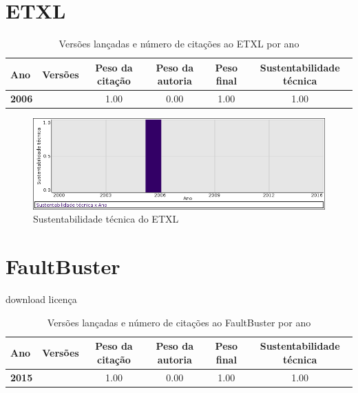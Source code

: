 \section{ETXL}


\begin{table}[H]
\caption{Versões lançadas e número de citações ao ETXL por ano}
\centering
\begin{tabular}{| l | c | c | c | c | c |}
  \hline
  Ano & Versões & Peso da citação & Peso da autoria & Peso final & Sustentabilidade técnica \\
  \hline
            {\bf 2006}
          &
          
          &
          1.00
          &
          0.00
          &
          1.00
          &
            {\color{blue} 1.00}
          \\
\hline
\end{tabular}
\end{table}

\begin{figure}[h]
  \center
  \includegraphics[scale=0.50]{imagens/softwares-charts/etxl.png}
  \caption{Sustentabilidade técnica do ETXL}
\end{figure}


\section{FaultBuster}
\checkmark download
\checkmark licença


\begin{table}[H]
\caption{Versões lançadas e número de citações ao FaultBuster por ano}
\centering
\begin{tabular}{| l | c | c | c | c | c |}
  \hline
  Ano & Versões & Peso da citação & Peso da autoria & Peso final & Sustentabilidade técnica \\
  \hline
            {\bf 2015}
          &
          
          &
          1.00
          &
          0.00
          &
          1.00
          &
            {\color{blue} 1.00}
          \\
\hline
\end{tabular}
\end{table}

